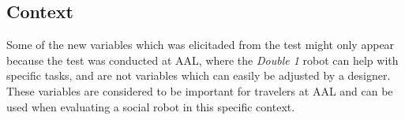 \subsection{Context}
 Some of the new variables which was elicitaded from the test might only appear because the test was conducted at AAL, where the \textit{Double 1} robot can help with specific tasks, and are not variables which can easily be adjusted by a designer. These variables are considered to be important for travelers at AAL and can be used when evaluating a social robot in this specific context. 